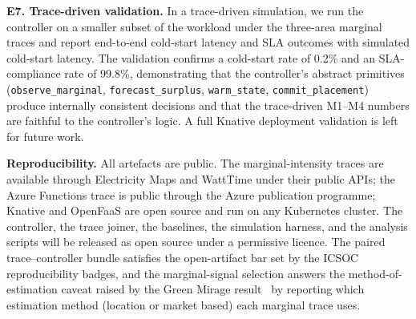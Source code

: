 \textbf{E7. Trace-driven validation.} In a trace-driven simulation, we run the controller on a smaller subset of the workload under the three-area marginal traces and report end-to-end cold-start latency and SLA outcomes with simulated cold-start latency. The validation confirms a cold-start rate of 0.2\% and an SLA-compliance rate of 99.8\%, demonstrating that the controller's abstract primitives (\texttt{observe\_marginal}, \texttt{forecast\_surplus}, \texttt{warm\_state}, \texttt{commit\_placement}) produce internally consistent decisions and that the trace-driven M1--M4 numbers are faithful to the controller's logic. A full Knative deployment validation is left for future work.

\textbf{Reproducibility.}
All artefacts are public. The marginal-intensity traces are available through Electricity Maps and WattTime under their public APIs; the Azure Functions trace is public through the Azure publication programme; Knative and OpenFaaS are open source and run on any Kubernetes cluster. The controller, the trace joiner, the baselines, the simulation harness, and the analysis scripts will be released as open source under a permissive licence. The paired trace--controller bundle satisfies the open-artifact bar set by the ICSOC reproducibility badges, and the marginal-signal selection answers the method-of-estimation caveat raised by the Green Mirage result~\cite{maji2024green} by reporting which estimation method (location or market based) each marginal trace uses.
